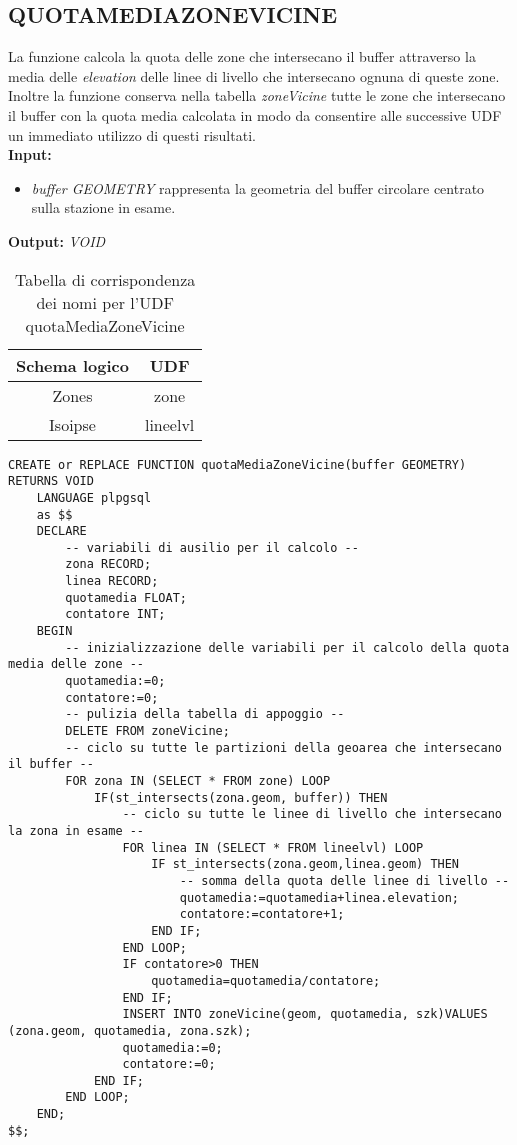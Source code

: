 \subsection{\textbf{QUOTAMEDIAZONEVICINE}}
La funzione calcola la quota delle zone che intersecano il buffer attraverso la media delle \textit{elevation} delle linee di livello che intersecano ognuna di queste zone. Inoltre la funzione conserva nella tabella \textit{zoneVicine} tutte le zone che intersecano il buffer con la quota media calcolata in modo da consentire alle successive UDF un immediato utilizzo di questi risultati.\\
\textbf{Input:} 
\begin{itemize}
\item \textit{buffer GEOMETRY} rappresenta la geometria del buffer circolare centrato sulla stazione in esame.
\end{itemize}
\textbf{Output:} \textit{VOID} 

\begin{table}[h]
\centering
\caption{Tabella di corrispondenza dei nomi per l'UDF quotaMediaZoneVicine}
\label{mapTb1}
\begin{tabular}{|c|c|}
\hline
Schema logico & UDF      \\ \hline
Zones         & zone     \\
Isoipse       & lineelvl \\ \hline
\end{tabular}
\end{table}

\begin{lstlisting}[style=mySQL]
CREATE or REPLACE FUNCTION quotaMediaZoneVicine(buffer GEOMETRY) RETURNS VOID
	LANGUAGE plpgsql
	as $$
	DECLARE
		-- variabili di ausilio per il calcolo --
		zona RECORD;
		linea RECORD;
		quotamedia FLOAT;
		contatore INT;
	BEGIN
		-- inizializzazione delle variabili per il calcolo della quota media delle zone --
		quotamedia:=0;
		contatore:=0;
		-- pulizia della tabella di appoggio --
		DELETE FROM zoneVicine;
		-- ciclo su tutte le partizioni della geoarea che intersecano il buffer --
		FOR zona IN (SELECT * FROM zone) LOOP
			IF(st_intersects(zona.geom, buffer)) THEN
				-- ciclo su tutte le linee di livello che intersecano la zona in esame --
				FOR linea IN (SELECT * FROM lineelvl) LOOP
					IF st_intersects(zona.geom,linea.geom) THEN
						-- somma della quota delle linee di livello --
						quotamedia:=quotamedia+linea.elevation;
						contatore:=contatore+1;
					END IF;
				END LOOP;
				IF contatore>0 THEN
					quotamedia=quotamedia/contatore;
				END IF;
				INSERT INTO zoneVicine(geom, quotamedia, szk)VALUES (zona.geom, quotamedia, zona.szk);
				quotamedia:=0;
				contatore:=0;
			END IF;
		END LOOP;
	END;
$$;
\end{lstlisting}

